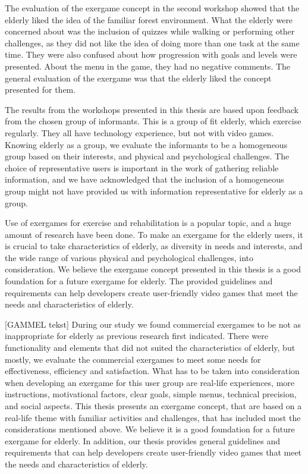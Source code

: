 The evaluation of the exergame concept in the second workshop showed that the elderly liked the idea of the familiar forest environment. What the elderly were concerned about was the inclusion of quizzes while walking or performing other challenges, as they did not like the idea of doing more than one task at the same time. They were also confused about how progression with goals and levels were presented. About the menu in the game, they had no negative comments. The general evaluation of the exergame was that the elderly liked the concept presented for them.  

The results from the workshops presented in this thesis are based upon feedback from the chosen group of informants. This is a group of fit elderly, which exercise regularly. They all have technology experience, but not with video games. Knowing elderly as a group, we evaluate the informants to be a homogeneous group based on their interests, and physical and psychological challenges. The choice of representative users is important in the work of gathering reliable information, and we have acknowledged that the inclusion of a homogeneous group might not have provided us with information representative for elderly as a group.       

Use of exergames for exercise and rehabilitation is a popular topic, and a huge amount of research have been done. To make an exergame for the elderly users, it is crucial to take characteristics of elderly, as diversity in needs and interests, and the wide range of various physical and psychological challenges, into consideration. We believe the exergame concept presented in this thesis is a good foundation for a future exergame for elderly. The provided guidelines and requirements can help developers create user-friendly video games that meet the needs and characteristics of elderly.

[GAMMEL tekst]
During our study we found commercial exergames to be not as inappropriate for elderly as previous research first indicated. There were functionality and elements that did not suited the characteristics of elderly, but mostly, we evaluate the commercial exergames to meet some needs for effectiveness, efficiency and satisfaction.  What has to be taken into consideration when developing an exergame for this user group are real-life experiences, more instructions, motivational factors, clear goals, simple menus, technical precision, and social aspects. This thesis presents an exergame concept, that are based on a real-life theme with familiar activities and challenges, that has included most the considerations mentioned above. We believe it is a good foundation for a future exergame for elderly. In addition, our thesis provides general guidelines and requirements that can help developers create user-friendly video games that meet the needs and characteristics of elderly.  

